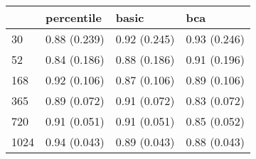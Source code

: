 \begin{tabular}{llll}
\toprule
 & percentile & basic & bca \\
\midrule
30 & 0.88 (0.239) & 0.92 (0.245) & 0.93 (0.246) \\
52 & 0.84 (0.186) & 0.88 (0.186) & 0.91 (0.196) \\
168 & 0.92 (0.106) & 0.87 (0.106) & 0.89 (0.106) \\
365 & 0.89 (0.072) & 0.91 (0.072) & 0.83 (0.072) \\
720 & 0.91 (0.051) & 0.91 (0.051) & 0.85 (0.052) \\
1024 & 0.94 (0.043) & 0.89 (0.043) & 0.88 (0.043) \\
\bottomrule
\end{tabular}
